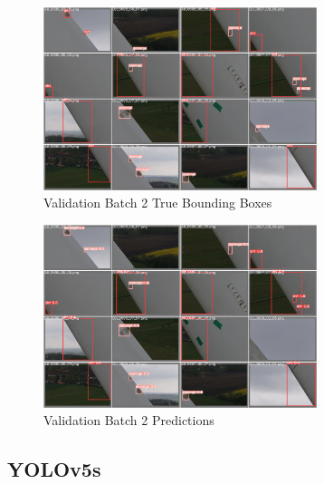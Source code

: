 \documentclass[conference]{IEEEtran}
\begin{document}
\begin{figure}[H]
    \centering
    \includegraphics[width=8cm]{Images/YOLOv5m/val_batch2_labels.jpg}
    \caption{Validation Batch 2 True Bounding Boxes}
\end{figure}
\begin{figure}[H]
    \centering
    \includegraphics[width=8cm]{Images/YOLOv5m/val_batch2_pred.jpg}
    \caption{Validation Batch 2 Predictions}
\end{figure}
\cleardoublepage
\subsection{YOLOv5s}
\end{document}
